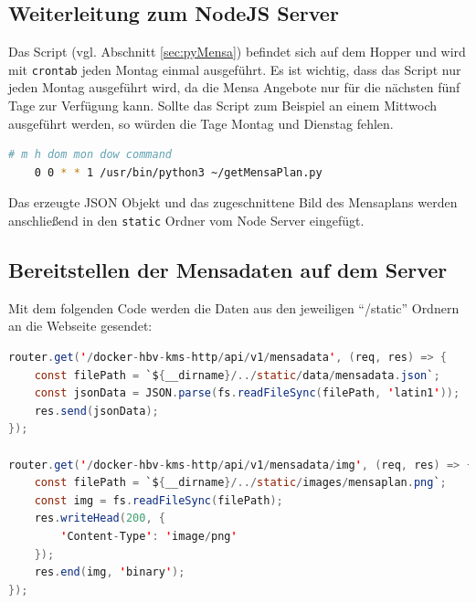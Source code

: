 \subsection{Weiterleitung zum NodeJS Server}

Das Script (vgl. Abschnitt \ref{sec:pyMensa}) befindet sich auf dem Hopper und wird mit \verb|crontab| jeden Montag einmal ausgeführt. Es ist wichtig, dass das Script nur jeden Montag ausgeführt wird, da die Mensa Angebote nur für die nächsten fünf Tage zur Verfügung kann. Sollte das Script zum Beispiel an einem Mittwoch ausgeführt werden, so würden die Tage Montag und Dienstag fehlen.\\

\begin{lstlisting}[language=Bash]
    # m h dom mon dow command
    0 0 * * 1 /usr/bin/python3 ~/getMensaPlan.py
\end{lstlisting}

Das erzeugte JSON Objekt und das zugeschnittene Bild des Mensaplans werden anschließend in den \verb|static| Ordner vom Node Server eingefügt.

\subsection{Bereitstellen der Mensadaten auf dem Server}

Mit dem folgenden Code werden die Daten aus den jeweiligen “/static” Ordnern an die Webseite gesendet:\\

\begin{lstlisting}[language=Java]
router.get('/docker-hbv-kms-http/api/v1/mensadata', (req, res) => {
    const filePath = `${__dirname}/../static/data/mensadata.json`;
    const jsonData = JSON.parse(fs.readFileSync(filePath, 'latin1'));
    res.send(jsonData);
});

router.get('/docker-hbv-kms-http/api/v1/mensadata/img', (req, res) => {
    const filePath = `${__dirname}/../static/images/mensaplan.png`;
    const img = fs.readFileSync(filePath);
    res.writeHead(200, {
        'Content-Type': 'image/png'
    });
    res.end(img, 'binary');
});    
\end{lstlisting}


